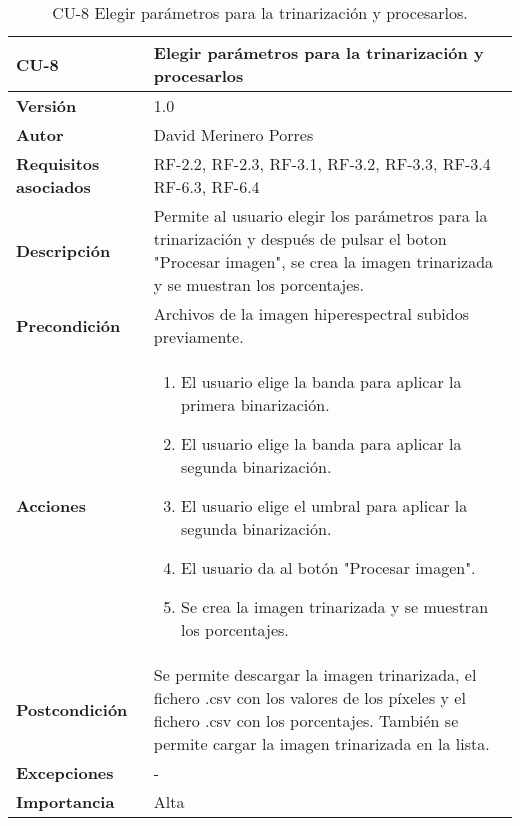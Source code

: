 \begin{table}[p]
	\centering
	\begin{tabularx}{\linewidth}{ p{} p{} }
		\toprule
		\textbf{CU-8}    & \textbf{Elegir parámetros para la trinarización y procesarlos}\\
		\toprule
		\textbf{Versión}              & 1.0    \\
		\textbf{Autor}                & David Merinero Porres \\
		\textbf{Requisitos asociados} & RF-2.2, RF-2.3, RF-3.1, RF-3.2, RF-3.3, RF-3.4 RF-6.3, RF-6.4 \\
		\textbf{Descripción}          & Permite al usuario elegir los parámetros para la trinarización y después de pulsar el boton "Procesar imagen", se crea la imagen trinarizada y se muestran los porcentajes. \\
		\textbf{Precondición}         & Archivos de la imagen hiperespectral subidos previamente. \\
		\textbf{Acciones}             &
		\begin{enumerate}
			\def\labelenumi{\arabic{enumi}.}
			\tightlist
			\item El usuario elige la banda para aplicar la primera binarización.
                \item El usuario elige la banda para aplicar la segunda binarización.
                \item El usuario elige el umbral para aplicar la segunda binarización.
                \item El usuario da al botón "Procesar imagen".
                \item Se crea la imagen trinarizada y se muestran los porcentajes.

		\end{enumerate}\\
		\textbf{Postcondición}        & Se permite descargar la imagen trinarizada, el fichero .csv con los valores de los píxeles y el fichero .csv con los porcentajes. También se permite cargar la imagen trinarizada en la lista. \\
		\textbf{Excepciones}          & - \\
		\textbf{Importancia}          & Alta \\
		\bottomrule
	\end{tabularx}
	\caption{CU-8 Elegir parámetros para la trinarización y procesarlos.}
\end{table}


